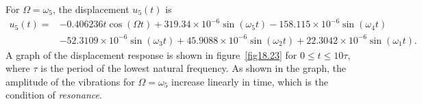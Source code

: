 \documentclass{AeroStructure-ERJohnson}
\begin{document}
\begin{example}
For $\Omega=\omega_{5}$, the displacement $u_{5}(t)$ is
\begin{align}\label{ex18.5y}
u_{5}(t)=&-0.406236 t \cos (\Omega t)+319.34 \times 10^{-6} \sin \left(\omega_{5} t\right)-158.115 \times 10^{-6} \sin \left(\omega_{4} t\right)\nonumber\\
&-52.3109 \times 10^{-6} \sin \left(\omega_{3} t\right)+ 45.9088 \times 10^{-6} \sin \left(\omega_{2} t\right)+22.3042 \times 10^{-6} \sin \left(\omega_{1} t\right).
\end{align}
{\def\thefigure{18.23}
}
\noindent A graph of the displacement response is shown in figure~\ref{fig18.23} for $0 \leq t \leq 10 \tau$, where $\tau$ is the period of the lowest natural frequency. As shown in the graph, the amplitude of the vibrations for $\Omega=\omega_{5}$ increase linearly in time, which is the condition of \textit{resonance}.
\end{example}

\vspace*{-1pc}
\end{document}
